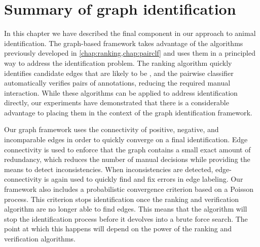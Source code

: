 
    \SplitErrorsPZ{}

    \SplitErrorsGZ{}

    \MergeErrorPZA{}

    \MergeErrorPZB{}

    \MergeErrorGZA{}

    \MergeErrorGZB{}

 
\FloatBarrier{}
\section{Summary of graph identification}\label{sec:graphconclusion}

In this chapter we have described the final component in our approach to animal identification.
The graph-based framework takes advantage of the algorithms previously developed in
  \cref{chap:ranking,chap:pairclf} and uses them in a principled way to address the identification problem.
The ranking algorithm quickly identifies candidate edges that are likely to be \meaningful{}, and the pairwise
  classifier automatically verifies pairs of annotations, reducing the required manual interaction.
While these algorithms can be applied to address identification directly, our experiments have demonstrated that
  there is a considerable advantage to placing them in the context of the graph identification framework.

Our graph framework uses the connectivity of positive, negative, and incomparable edges in order to quickly
  converge on a final identification.
Edge connectivity is used to enforce that the graph contains a small exact amount of redundancy, which reduces
  the number of manual decisions while providing the means to detect inconsistencies.
When inconsistencies are detected, edge-connectivity is again used to quickly find and fix errors in edge
  labeling.
Our framework also includes a probabilistic convergence criterion based on a Poisson process.
This criterion stops identification once the ranking and verification algorithm are no longer able to find
  \meaningful{} edges.
This means that the algorithm will stop the identification process before it devolves into a brute force search.
The point at which this happens will depend on the power of the ranking and verification algorithms.

